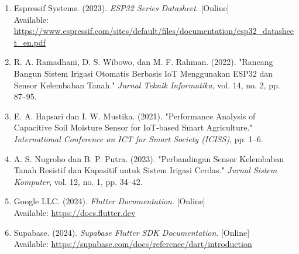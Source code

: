 \documentclass[12pt,a4paper,oneside]{report}
\begin{document}
\begin{enumerate}

\item
Espressif Systems. (2023). \textit{ESP32 Series Datasheet}. [Online] \\
Available: \url{https://www.espressif.com/sites/default/files/documentation/esp32_datasheet_en.pdf}

\item
R. A. Ramadhani, D. S. Wibowo, dan M. F. Rahman. (2022). "Rancang Bangun Sistem Irigasi Otomatis Berbasis IoT Menggunakan ESP32 dan Sensor Kelembaban Tanah." \textit{Jurnal Teknik Informatika}, vol. 14, no. 2, pp. 87--95.

\item
E. A. Hapsari dan I. W. Mustika. (2021). "Performance Analysis of Capacitive Soil Moisture Sensor for IoT-based Smart Agriculture." \textit{International Conference on ICT for Smart Society (ICISS)}, pp. 1--6.

\item
A. S. Nugroho dan B. P. Putra. (2023). "Perbandingan Sensor Kelembaban Tanah Resistif dan Kapasitif untuk Sistem Irigasi Cerdas." \textit{Jurnal Sistem Komputer}, vol. 12, no. 1, pp. 34--42.

\item
Google LLC. (2024). \textit{Flutter Documentation}. [Online] \\
Available: \url{https://docs.flutter.dev}

\item
Supabase. (2024). \textit{Supabase Flutter SDK Documentation}. [Online] \\
Available: \url{https://supabase.com/docs/reference/dart/introduction}

\end{enumerate}
\end{document}

